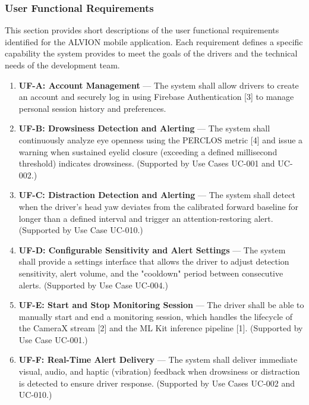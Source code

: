 \documentclass[11pt]{report}
\begin{document}
\subsubsection{User Functional Requirements}
This section provides short descriptions of the user functional requirements identified for the ALVION mobile application. Each requirement defines a specific capability the system provides to meet the goals of the drivers and the technical needs of the development team.

\begin{enumerate}

    \item \textbf{UF-A: Account Management} —
    The system shall allow drivers to create an account and securely log in using Firebase Authentication [3] to manage personal session history and preferences.

    \item \textbf{UF-B: Drowsiness Detection and Alerting} —
    The system shall continuously analyze eye openness using the PERCLOS metric [4] and issue a warning when sustained eyelid closure (exceeding a defined millisecond threshold) indicates drowsiness. (Supported by Use Cases UC-001 and UC-002.)

    \item \textbf{UF-C: Distraction Detection and Alerting} —
    The system shall detect when the driver’s head yaw deviates from the calibrated forward baseline for longer than a defined interval and trigger an attention-restoring alert. (Supported by Use Case UC-010.)

    \item \textbf{UF-D: Configurable Sensitivity and Alert Settings} —
    The system shall provide a settings interface that allows the driver to adjust detection sensitivity, alert volume, and the "cooldown" period between consecutive alerts. (Supported by Use Case UC-004.)

    \item \textbf{UF-E: Start and Stop Monitoring Session} —
    The driver shall be able to manually start and end a monitoring session, which handles the lifecycle of the CameraX stream [2] and the ML Kit inference pipeline [1]. (Supported by Use Case UC-001.)

    \item \textbf{UF-F: Real-Time Alert Delivery} —
    The system shall deliver immediate visual, audio, and haptic (vibration) feedback when drowsiness or distraction is detected to ensure driver response. (Supported by Use Cases UC-002 and UC-010.)


\end{enumerate}
\end{document}
